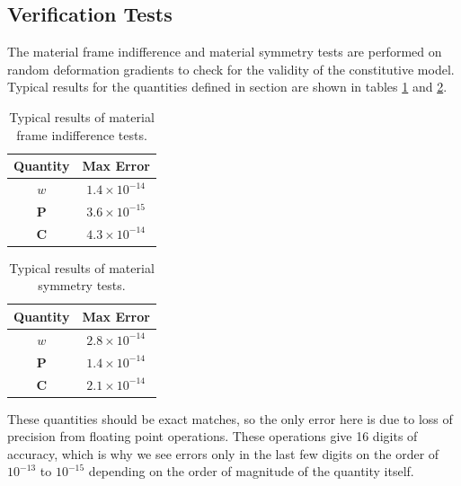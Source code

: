 \documentclass[]{spie}  %
\newcommand\Tstrut{\rule{0pt}{2.6ex}}         %
\begin{document}
\subsection{Verification Tests}
The material frame indifference and material symmetry tests are performed on random deformation gradients to check for the validity of the constitutive model. Typical results for the quantities defined in section \textit{} are shown in tables \ref{table: material frame indifference} and \ref{table: material symmetry}.




\begin{table}[h]
	\centering
	\caption{Typical results of material frame indifference tests.}
	\begin{tabular}{ | c | c | }
		\hline
		Quantity & Max Error \Tstrut \\ \hline
		$w$ 		& $1.4 \times 10^{-14}$ \Tstrut \\
		$\bm{P}$ 	& $3.6 \times 10^{-15}$ \\
		$\bm{C}$ 	& $4.3 \times 10^{-14}$ \\
		\hline
	\end{tabular}
	\label{table: material frame indifference}
\end{table}

\begin{table}[h]
	\centering
	\caption{Typical results of material symmetry tests.}
	\begin{tabular}{ | c | c | }
		\hline
		Quantity & Max Error \Tstrut \\ \hline
		$w$ 		& $2.8 \times 10^{-14}$ \Tstrut \\
		$\bm{P}$ 	& $1.4 \times 10^{-14}$ \\
		$\bm{C}$ 	& $2.1 \times 10^{-14}$ \\
		\hline
	\end{tabular}
	\label{table: material symmetry}
\end{table}

These quantities should be exact matches, so the only error here is due to loss of precision from floating point operations. These operations give 16 digits of accuracy, which is why we see errors only in the last few digits on the order of $10^{-13}$ to $10^{-15}$ depending on the order of magnitude of the quantity itself.  
\end{document}
